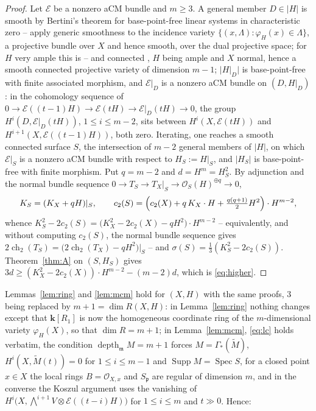 \documentclass[11pt]{amsart}
\theoremstyle{remark}
\theoremstyle{definition}
\newcommand{\bk}{\mathbf{k}}
\newcommand{\cO}{\mathcal{O}}
\newcommand{\cE}{\mathcal{E}}
\DeclareMathOperator{\depth}{depth}
\DeclareMathOperator{\Spec}{Spec}
\DeclareMathOperator{\Supp}{Supp}
\begin{document}
\begin{proof}
Let $\cE$ be a nonzero aCM bundle and $m\ge3$. A general member $D\in|H|$ is smooth by Bertini's theorem for base-point-free linear systems in characteristic zero -- apply generic smoothness \cite[III.10.7]{Ha} to the incidence variety $\{(x,\Lambda):\varphi_H(x)\in\Lambda\}$, a projective bundle over $X$ and hence smooth, over the dual projective space; for $H$ very ample this is \cite[III.10.9]{Ha} -- and connected \cite[III.7.9]{Ha}, $H$ being ample and $X$ normal, hence a smooth connected projective variety of dimension $m-1$; $|H|_D|$ is base-point-free with finite associated morphism, and $\cE|_D$ is a nonzero aCM bundle on $(D,H|_D)$: in the cohomology sequence of $0\to\cE((t-1)H)\to\cE(tH)\to\cE|_D(tH)\to0$, the group $H^i(D,\cE|_D(tH))$, $1\le i\le m-2$, sits between $H^i(X,\cE(tH))$ and $H^{i+1}(X,\cE((t-1)H))$, both zero. Iterating, one reaches a smooth connected surface $S$, the intersection of $m-2$ general members of $|H|$, on which $\cE|_S$ is a nonzero aCM bundle with respect to $H_S:=H|_S$, and $|H_S|$ is base-point-free with finite morphism. Put $q=m-2$ and $d=H^m=H_S^2$. By adjunction and the normal bundle sequence $0\to T_S\to T_X|_S\to\cO_S(H)^{\oplus q}\to0$,
\[
K_S=(K_X+qH)|_S,\qquad c_2(S)=\Bigl(c_2(X)+q\,K_X\cdot H+\tfrac{q(q+1)}2H^2\Bigr)\cdot H^{m-2},
\]
whence $K_S^2-2c_2(S)=\bigl(K_X^2-2c_2(X)-qH^2\bigr)\cdot H^{m-2}$ -- equivalently, and without computing $c_2(S)$, the normal bundle sequence gives $2\operatorname{ch}_2(T_S)=\bigl(2\operatorname{ch}_2(T_X)-qH^2\bigr)|_S$ -- and $\sigma(S)=\tfrac13(K_S^2-2c_2(S))$. Theorem~\ref{thm:A} on $(S,H_S)$ gives $3d\ge(K_X^2-2c_2(X))\cdot H^{m-2}-(m-2)d$, which is \eqref{eq:higher}.
\end{proof}

Lemmas~\ref{lem:ring} and \ref{lem:mcm} hold for $(X,H)$ with the same proofs, $3$ being replaced by $m+1=\dim R(X,H)$: in Lemma~\ref{lem:ring} nothing changes except that $\bk[R_1]$ is now the homogeneous coordinate ring of the $m$-dimensional variety $\varphi_H(X)$, so that $\dim R=m+1$; in Lemma~\ref{lem:mcm}, \eqref{eq:lc} holds verbatim, the condition $\depth_{\mathfrak m}M=m+1$ forces $M=\Gamma_*(\widetilde M)$, $H^i(X,\widetilde M(t))=0$ for $1\le i\le m-1$ and $\Supp M=\Spec S$, for a closed point $x\in X$ the local rings $B=\cO_{X,x}$ and $S_{\mathfrak p}$ are regular of dimension $m$, and in the converse the Koszul argument uses the vanishing of $H^i\bigl(X,\bigwedge^{i+1}V\otimes\cE((t-i)H)\bigr)$ for $1\le i\le m$ and $t\gg0$. Hence:
\end{document}
